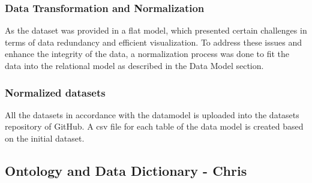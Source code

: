 \subsubsection{Data Transformation and Normalization}
As the dataset was provided in a flat model, which presented certain challenges in terms of data redundancy and efficient visualization. To address these issues and enhance the integrity of the data, a normalization process was done to fit the data into the relational model as described in the Data Model section.

\subsubsection{Normalized datasets}
All the datasets in accordance with the datamodel is uploaded into the datasets repository of GitHub. A csv file for each table of the data model is created based on the initial dataset.

\subsection{Ontology and Data Dictionary - Chris}
